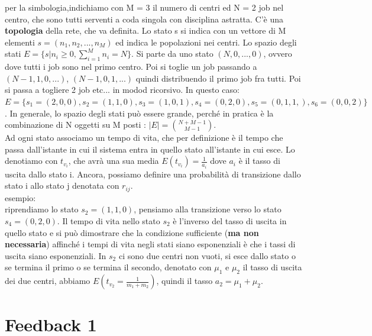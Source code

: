 \documentclass{article}
\begin{document}
per la simbologia,indichiamo con M = 3 il numero di centri ed N = 2 job nel centro, che sono tutti serventi a coda singola con disciplina astratta. C'è una \textbf{topologia} della rete, che va definita. Lo stato s si indica con un vettore di M elementi $s = (n_1, n_2,...,n_M)$ ed indica le popolazioni nei centri. Lo spazio degli stati $E = \{s | n_i \geq 0, \sum\limits_{i=1}^{M} n_i = N\}$. Si parte da uno stato $(N,0,...,0)$, ovvero dove tutti i job sono nel primo centro. Poi si toglie un job passando a $(N-1,1,0,...)$, $(N-1,0,1,...)$ quindi distribuendo il primo job fra tutti. Poi si passa a togliere 2 job etc... in modod ricorsivo. In questo caso: $E = \{ s_1 = (2,0,0), s_2 =(1,1,0), s_3 =(1,0,1), s_4 =(0, 2, 0), s_5 =(0,1,1,), s_6 =(0,0,2)\}$. In generale, lo spazio degli stati può essere grande, perché in pratica è la combinazione di N oggetti su M posti : $|E| = \binom{N+M-1}{M-1}$.\\ Ad ogni stato associamo un tempo di vita, che per definizione è il tempo che passa dall'istante in cui il sistema entra in quello stato all'istante in cui esce. Lo denotiamo con $t_{v_i}$, che avrà una sua media $E(t_{v_i}) = \frac{1}{a_i}$ dove $a_i$ è il tasso di uscita dallo stato i. Ancora, possiamo definire una probabilità di transizione dallo stato i allo stato j denotata con $r_{ij}$.\\ esempio: \\ riprendiamo lo stato $s_2 = (1,1,0)$, pensiamo alla transizione verso lo stato $s_4 = (0,2,0)$. Il tempo di vita nello stato $s_2$ è l'inverso del tasso di uscita in quello stato e si può dimostrare che la condizione sufficiente (\textbf{ma non necessaria}) affinché i tempi di vita negli stati siano esponenziali è che i tassi di uscita siano esponenziali. In $s_2$ ci sono due centri non vuoti, si esce dallo stato o se termina il primo o se termina il secondo, denotato con $\mu_1$ e $\mu_2$ il tasso di uscita dei due centri, abbiamo $E(t_{v_2} = \frac{1}{m_1+m_2})$, quindi il tasso $a_2 = \mu_1 + \mu_2$.




\newpage
\section{Feedback 1}
\end{document}
